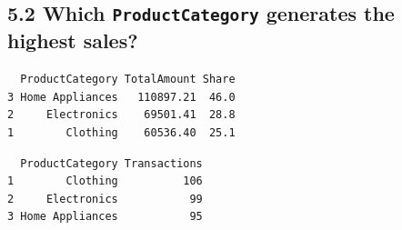 \documentclass[
]{article}
\newenvironment{Shaded}{\begin{snugshade}}{\end{snugshade}}
\newcommand{\AttributeTok}[1]{\textcolor[rgb]{0.13,0.29,0.53}{#1}}
\newcommand{\DecValTok}[1]{\textcolor[rgb]{0.00,0.00,0.81}{#1}}
\newcommand{\FunctionTok}[1]{\textcolor[rgb]{0.13,0.29,0.53}{\textbf{#1}}}
\newcommand{\NormalTok}[1]{#1}
\newcommand{\OtherTok}[1]{\textcolor[rgb]{0.56,0.35,0.01}{#1}}
\newcommand{\SpecialCharTok}[1]{\textcolor[rgb]{0.81,0.36,0.00}{\textbf{#1}}}
\newcommand{\StringTok}[1]{\textcolor[rgb]{0.31,0.60,0.02}{#1}}
\begin{document}
\subsection{\texorpdfstring{5.2 Which \texttt{ProductCategory} generates
the highest
sales?}{5.2 Which ProductCategory generates the highest sales?}}\label{which-productcategory-generates-the-highest-sales}

\begin{Shaded}
\end{Shaded}

\begin{verbatim}
  ProductCategory TotalAmount Share
3 Home Appliances   110897.21  46.0
2     Electronics    69501.41  28.8
1        Clothing    60536.40  25.1
\end{verbatim}

\begin{Shaded}
\end{Shaded}

\begin{verbatim}
  ProductCategory Transactions
1        Clothing          106
2     Electronics           99
3 Home Appliances           95
\end{verbatim}
\end{document}
